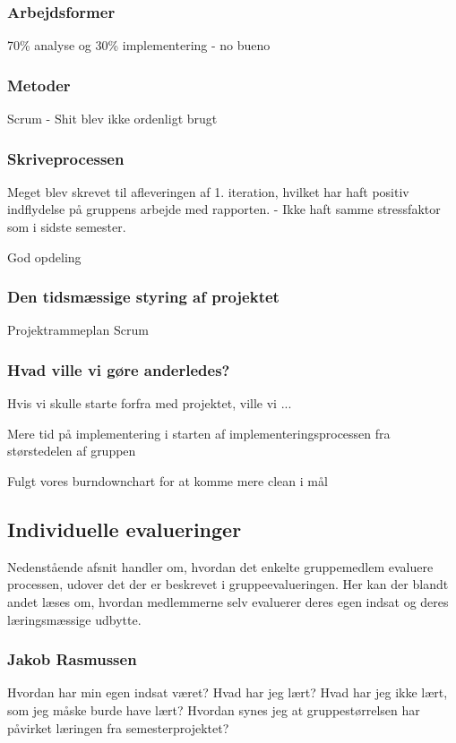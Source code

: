 \subsubsection{Arbejdsformer}
70\% analyse og 30\% implementering - no bueno

\subsubsection{Metoder}
Scrum - Shit blev ikke ordenligt brugt


\subsubsection{Skriveprocessen}
Meget blev skrevet til afleveringen af 1. iteration, hvilket har haft positiv indflydelse på gruppens arbejde med rapporten. - Ikke haft samme stressfaktor som i sidste semester.

God opdeling

\subsubsection{Den tidsmæssige styring af projektet}
Projektrammeplan
Scrum

\subsubsection{Hvad ville vi gøre anderledes?}
Hvis vi skulle starte forfra med projektet, ville vi ...

Mere tid på implementering i starten af implementeringsprocessen fra størstedelen af gruppen

Fulgt vores burndownchart for at komme mere clean i mål


\subsection{Individuelle evalueringer}
Nedenstående afsnit handler om, hvordan det enkelte gruppemedlem evaluere processen, udover det der er beskrevet i gruppeevalueringen. Her kan der blandt andet læses om, hvordan medlemmerne selv evaluerer deres egen indsat og deres læringsmæssige udbytte.  

\subsubsection{Jakob Rasmussen}
Hvordan har min egen indsat været?
Hvad har jeg lært?
Hvad har jeg ikke lært, som jeg måske burde have lært?
Hvordan synes jeg at gruppestørrelsen har påvirket læringen fra semesterprojektet?


